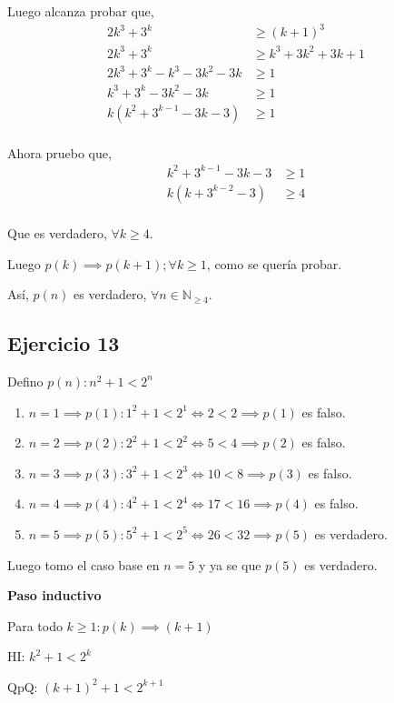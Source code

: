 Luego alcanza probar que,
\begin{align*}
    2k^3 + 3^k &\geq (k+1)^3 \\
    2k^3 + 3^k &\geq k^3 + 3k^2 + 3k + 1 \\
    2k^3 + 3^k - k^3 - 3k^2 - 3k &\geq 1 \\
    k^3 + 3^k - 3k^2 - 3k &\geq 1 \\
    k(k^2 + 3^{k-1} - 3k -3) &\geq 1 \\
\end{align*}

Ahora pruebo que,
\begin{align*}
    k^2 + 3^{k-1} - 3k -3 &\geq 1 \\
    k(k + 3^{k-2} - 3) &\geq 4 \\
\end{align*}

Que es verdadero, $\forall k \geq 4$.

Luego $p(k) \implies p(k+1); \forall k \geq 1$, como se quería probar.

Así, $p(n)$ es verdadero, $\forall n \in \mathbb{N}_{\geq 4}$.

\subsection{Ejercicio 13}

Defino $ p(n): n^2 +1 < 2^n$

\begin{enumerate}
    \item[] $ n= 1 \implies p(1): 1^2 + 1<2^1 \iff 2<2 \implies p(1)$ es falso.
    \item[] $ n= 2 \implies p(2): 2^2 + 1<2^2 \iff 5<4 \implies p(2)$ es falso.  
    \item[] $ n= 3 \implies p(3): 3^2 + 1<2^3 \iff 10<8 \implies p(3)$ es falso.
    \item[] $ n= 4 \implies p(4): 4^2 + 1<2^4 \iff 17<16 \implies p(4)$ es falso. 
    \item[] $ n= 5 \implies p(5): 5^2 + 1<2^5 \iff 26<32 \implies p(5)$ es verdadero. 
\end{enumerate}

Luego tomo el caso base en $ n = 5 $ y ya se que $p(5)$ es verdadero.

\textbf{Paso inductivo}

Para todo $k \geq 1: p(k) \implies (k+1)$

HI: $k^2 +1 < 2^k$

QpQ: $ (k+1)^2 +1 < 2^{k+1}$

